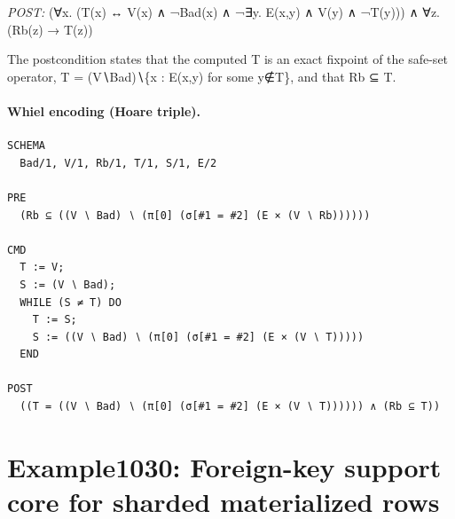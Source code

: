 \documentclass[10pt]{article}
\begin{document}
\textit{POST:} (∀x. (T(x) ↔ V(x) ∧ ¬Bad(x) ∧ ¬∃y. E(x,y) ∧ V(y) ∧ ¬T(y))) ∧ ∀z. (Rb(z) → T(z))\par The postcondition states that the computed T is an exact fixpoint of the safe-set operator, T = (V∖Bad)∖\{x : E(x,y) for some y∉T\}, and that Rb ⊆ T.

\paragraph{Whiel encoding (Hoare triple).}

\begin{Verbatim}[fontsize=\scriptsize,breaklines=true,breakanywhere=true,frame=single,framesep=1.5mm]
SCHEMA
  Bad/1, V/1, Rb/1, T/1, S/1, E/2

PRE
  (Rb ⊆ ((V ∖ Bad) ∖ (π[0] (σ[#1 = #2] (E × (V ∖ Rb))))))

CMD
  T := V;
  S := (V ∖ Bad);
  WHILE (S ≠ T) DO
    T := S;
    S := ((V ∖ Bad) ∖ (π[0] (σ[#1 = #2] (E × (V ∖ T)))))
  END

POST
  ((T = ((V ∖ Bad) ∖ (π[0] (σ[#1 = #2] (E × (V ∖ T)))))) ∧ (Rb ⊆ T))
\end{Verbatim}

\Needspace{0.45\textheight}

\section{Example1030: Foreign-key support core for sharded materialized rows}\label{case:Example1030}
\end{document}
